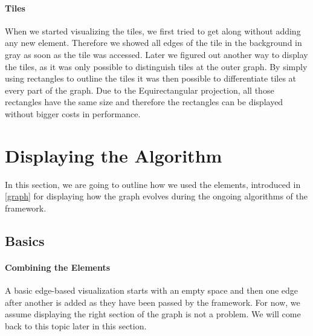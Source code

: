 \documentclass
[
    paper = a4,
    pagesize,
    12 pt,
    oneside,                       %
    open = right,
    DIV = calc,
    BCOR = 0 mm,                   %
    bibtotoc
]
{scrbook}
\begin{document}
\paragraph{Tiles}
When we started visualizing the tiles, we first tried to get along without adding any new element.
Therefore we showed all edges of the tile in the background in gray as soon as the tile was accessed.
Later we figured out another way to display the tiles, as it was only possible to distinguish tiles at the outer graph.
By simply using rectangles to outline the tiles it was then possible to differentiate tiles at every part of the graph.
Due to the Equirectangular projection, all those rectangles have the same size and therefore the rectangles can be displayed without bigger costs in performance.


\section{Displaying the Algorithm} \label{algorithm}

In this section, we are going to outline how we used the elements, introduced in \cref{graph} for displaying how the graph evolves during the ongoing algorithms of the framework.

\subsection{Basics} \label{basic}

\paragraph{Combining the Elements}
A basic edge-based visualization starts with an empty space and then one edge after another is added as they have been passed by the framework.
For now, we assume displaying the right section of the graph is not a problem.
We will come back to this topic later in this section.
\end{document}
